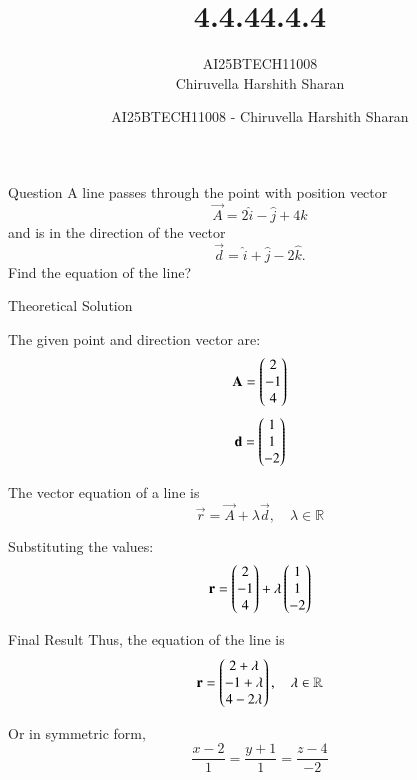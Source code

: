 \documentclass{beamer}
\title
{4.4.4}
\author 
{AI25BTECH11008\\Chiruvella Harshith Sharan}
\title{4.4.4}
\author{AI25BTECH11008 - Chiruvella Harshith Sharan}
\date{}
\begin{document}
\frame{\titlepage}

\begin{frame}{Question}
\centering
A line passes through the point with position vector
\[
\vec{A} = 2\hat{i} - \hat{j} + 4\hat{k}
\]
and is in the direction of the vector
\[
\vec{d} = \hat{i} + \hat{j} - 2\hat{k}.
\]
Find the equation of the line?
\end{frame}

\begin{frame}{Theoretical Solution}
\vspace{0.4cm}

The given point and direction vector are:
\begin{equation}
\mathbf{A} = \begin{pmatrix}2 \\ -1 \\ 4\end{pmatrix}
\end{equation}
\begin{equation}
\mathbf{d} = \begin{pmatrix}1 \\ 1 \\ -2\end{pmatrix}
\end{equation}

The vector equation of a line is
\begin{equation}
\vec{r} = \vec{A} + \lambda \vec{d}, \quad \lambda \in \mathbb{R}
\end{equation}

Substituting the values:
\begin{equation}
\mathbf{r} = \begin{pmatrix}2 \\ -1 \\ 4\end{pmatrix} + \lambda \begin{pmatrix}1 \\ 1 \\ -2\end{pmatrix}
\end{equation}
\end{frame}

\begin{frame}{Final Result}
Thus, the equation of the line is
\begin{equation}
\mathbf{r} = \begin{pmatrix}2 + \lambda \\ -1 + \lambda \\ 4 - 2\lambda\end{pmatrix}, \quad \lambda \in \mathbb{R}
\end{equation}

Or in symmetric form,
\begin{equation}
\frac{x-2}{1} = \frac{y+1}{1} = \frac{z-4}{-2}
\end{equation}
\end{frame}
\end{document}
